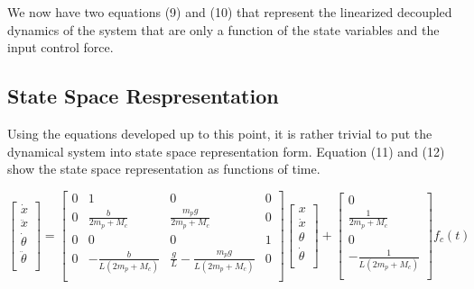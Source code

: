 \documentclass[titlepage]{article}
\begin{document}
We now have two equations (9) and (10) that represent the linearized decoupled dynamics of the system that are only a function of the state variables and the input control force.

\subsection{State Space Respresentation}

Using the equations developed up to this point, it is rather trivial to put the dynamical system into state space representation form.
Equation (11) and (12) show the state space representation as functions of time.

\begin{equation}
\begin{bmatrix}
\dot{x}\\
\ddot{x}\\
\dot{\theta}\\
\ddot{\theta}\\
\end{bmatrix} =
\begin{bmatrix}
0 & 1  & 0 & 0\\
0 & \frac{b}{2m_{p} + M_{c}}  & \frac{m_{p}g}{2m_{p} + M_{c}} & 0\\
0 & 0  & 0 & 1\\
0 & -\frac{b}{L\left(2m_{p} + M_{c}\right)}  & \frac{g}{L} - \frac{m_{p}g}{L\left(2m_{p} + M_{c}\right)} & 0\\
\end{bmatrix}
\begin{bmatrix}
x\\
\dot{x}\\
\theta\\
\dot{\theta}\\
\end{bmatrix}+ \begin{bmatrix}
0\\
\frac{1}{2m_{p} + M_{c}}\\
0\\
-\frac{1}{L\left(2m_{p} + M_{c}\right)}\\
\end{bmatrix} f_{c}\left(t\right)
\end{equation}
\end{document}
